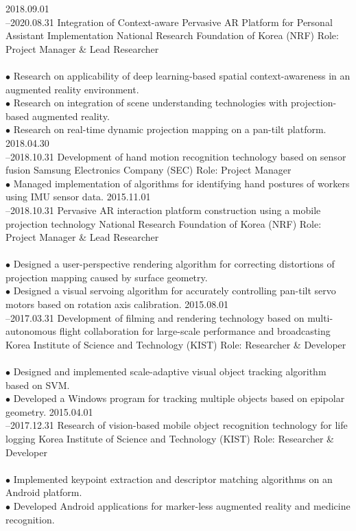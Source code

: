 \documentclass[]{friggeri-cv}
\begin{document}
\begin{entrylist}
  \entry
    {2018.09.01\\--2020.08.31} %
    {Integration of Context-aware Pervasive AR Platform for Personal Assistant Implementation}
    {National Research Foundation of Korea (NRF)}
    {Role: Project Manager \& Lead Researcher\\
    \\
    $\bullet$ Research on applicability of deep learning-based spatial context-awareness in an augmented reality environment.\\
    $\bullet$ Research on integration of  scene understanding technologies with projection-based augmented reality.\\
    $\bullet$ Research on real-time dynamic projection mapping on a pan-tilt platform.
    }
  \entry
    {2018.04.30\\--2018.10.31}
    {Development of hand motion recognition technology based on sensor fusion}
    {Samsung Electronics Company (SEC)}
    {Role: Project Manager\\
    
    $\bullet$ Managed implementation of algorithms for identifying hand postures of workers using IMU sensor data.
    }
  \entry
    {2015.11.01\\--2018.10.31} 
    {Pervasive AR interaction platform construction using a mobile projection technology}
    {National Research Foundation of Korea (NRF)}
    {Role: Project Manager \& Lead Researcher\\
    \\
    $\bullet$ Designed a user-perspective rendering algorithm for correcting distortions of projection mapping caused by surface geometry.\\
    $\bullet$ Designed  a visual servoing algorithm for accurately controlling pan-tilt servo motors based on rotation axis calibration.
    }
  \entry
    {2015.08.01\\--2017.03.31}
    {Development of filming and rendering technology based on multi-autonomous flight collaboration for large-scale performance and broadcasting}
    {Korea Institute of Science and Technology (KIST)}
    {Role: Researcher \& Developer\\
    \\
    $\bullet$ Designed and implemented scale-adaptive visual object tracking algorithm based on SVM.\\
    $\bullet$ Developed a Windows program for tracking multiple objects based on epipolar geometry.
    }
  \entry
    {2015.04.01\\--2017.12.31}
    {Research of vision-based mobile object recognition technology for life logging}
    {Korea Institute of Science and Technology (KIST)}
    {Role: Researcher \& Developer\\
    \\
    $\bullet$ Implemented keypoint extraction and descriptor matching algorithms on an Android platform.\\
    $\bullet$ Developed Android applications for marker-less augmented reality and medicine recognition.
    }
\end{entrylist}
\end{document}
